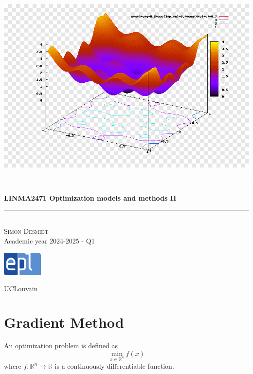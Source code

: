 \documentclass[12pt, openany]{report}
\newcommand{\HRule}{\rule{\linewidth}{0.5mm}}
\theoremstyle{definition}
\begin{document}
\begin{titlepage}
    \begin{sffamily}
    \begin{center}
        \includegraphics[scale=0.25]{img/page_de_garde.png} \\[1cm]
        \HRule \\[0.4cm]
        { \huge \bfseries LINMA2471 Optimization models and methods II \\[0.4cm] }
    
        \HRule \\[1.5cm]
        \textsc{\LARGE Simon Desmidt}\\[1cm]
        \vfill
        \vspace{2cm}
        {\large Academic year 2024-2025 - Q1}
        \vspace{0.4cm}
         
        \includegraphics[width=0.15\textwidth]{img/epl.png}
        
        UCLouvain\\
    
    \end{center}
    \end{sffamily}
\end{titlepage}

\setcounter{tocdepth}{1}
\tableofcontents
\chapter{Gradient Method}
An optimization problem is defined as 
\begin{equation}\label{eq:1}
    \min_{x\in \mathbb{R}^n} f(x)
\end{equation}
where \(f:\mathbb{R}^n\rightarrow\mathbb{R}\) is a continuously differentiable function. 
\end{document}
